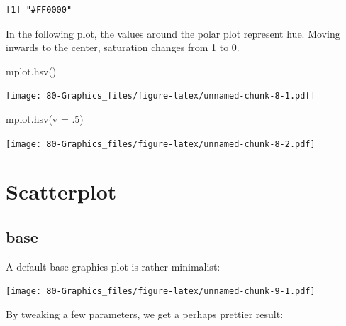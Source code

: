 \documentclass[
]{book}
\newenvironment{Shaded}{\begin{snugshade}}{\end{snugshade}}
\newcommand{\AttributeTok}[1]{\textcolor[rgb]{0.77,0.63,0.00}{#1}}
\newcommand{\DecValTok}[1]{\textcolor[rgb]{0.00,0.00,0.81}{#1}}
\newcommand{\FloatTok}[1]{\textcolor[rgb]{0.00,0.00,0.81}{#1}}
\newcommand{\FunctionTok}[1]{\textcolor[rgb]{0.00,0.00,0.00}{#1}}
\newcommand{\NormalTok}[1]{#1}
\newcommand{\SpecialCharTok}[1]{\textcolor[rgb]{0.00,0.00,0.00}{#1}}
\newcommand{\StringTok}[1]{\textcolor[rgb]{0.31,0.60,0.02}{#1}}
\begin{document}
\begin{verbatim}
[1] "#FF0000"
\end{verbatim}

In the following plot, the values around the polar plot represent hue. Moving inwards to the center, saturation changes from 1 to 0.

\begin{Shaded}
\begin{Highlighting}[]
\FunctionTok{mplot.hsv}\NormalTok{()}
\end{Highlighting}
\end{Shaded}

\texttt{[image: 80-Graphics\_files/figure-latex/unnamed-chunk-8-1.pdf]}

\begin{Shaded}
\begin{Highlighting}[]
\FunctionTok{mplot.hsv}\NormalTok{(}\AttributeTok{v =}\NormalTok{ .}\DecValTok{5}\NormalTok{)}
\end{Highlighting}
\end{Shaded}

\texttt{[image: 80-Graphics\_files/figure-latex/unnamed-chunk-8-2.pdf]}

\hypertarget{scatterplot}{%
\section{Scatterplot}\label{scatterplot}}

\hypertarget{base-2}{%
\subsection{base}\label{base-2}}

A default base graphics plot is rather minimalist:

\begin{Shaded}
\end{Shaded}

\texttt{[image: 80-Graphics\_files/figure-latex/unnamed-chunk-9-1.pdf]}

By tweaking a few parameters, we get a perhaps prettier result:

\begin{Shaded}
\end{Shaded}
\end{document}
